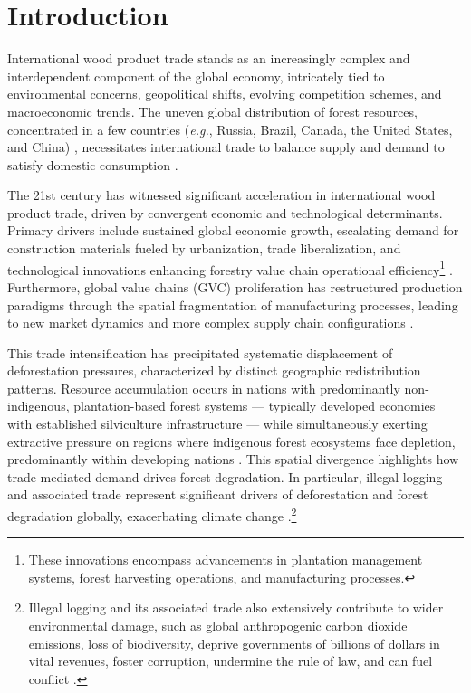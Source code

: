 \documentclass[
  authoryear,
  review,
  3p]{elsarticle}
\begin{document}
\section{Introduction}\label{introduction}

International wood product trade stands as an increasingly complex and
interdependent component of the global economy, intricately tied to
environmental concerns, geopolitical shifts, evolving competition
schemes, and macroeconomic trends. The uneven global distribution of
forest resources, concentrated in a few countries (\emph{e.g.}, Russia,
Brazil, Canada, the United States, and China) \citep{fao_state_2024},
necessitates international trade to balance supply and demand to satisfy
domestic consumption \citep{long_exploring_2019, huang_static_2024}.

The 21st century has witnessed significant acceleration in international
wood product trade, driven by convergent economic and technological
determinants. Primary drivers include sustained global economic growth,
escalating demand for construction materials fueled by urbanization,
trade liberalization, and technological innovations enhancing forestry
value chain operational efficiency\footnote{These innovations encompass
  advancements in plantation management systems, forest harvesting
  operations, and manufacturing processes.}
\citep{prestemon_international_2003, unecefao_forest_2022-1}.
Furthermore, global value chains (GVC) proliferation has restructured
production paradigms through the spatial fragmentation of manufacturing
processes, leading to new market dynamics and more complex supply chain
configurations \citep{amador_networks_2017}.

This trade intensification has precipitated systematic displacement of
deforestation pressures, characterized by distinct geographic
redistribution patterns. Resource accumulation occurs in nations with
predominantly non-indigenous, plantation-based forest systems ---
typically developed economies with established silviculture
infrastructure --- while simultaneously exerting extractive pressure on
regions where indigenous forest ecosystems face depletion, predominantly
within developing nations
\citep{prestemon_international_2003, leblois_what_2017, pendrill_deforestation_2019, abman_does_2020}.
This spatial divergence highlights how trade-mediated demand drives
forest degradation. In particular, illegal logging and associated trade
represent significant drivers of deforestation and forest degradation
globally, exacerbating climate change
\citep{lawson_illegal_2010}.\footnote{Illegal logging and its associated
  trade also extensively contribute to wider environmental damage, such
  as global anthropogenic carbon dioxide emissions, loss of
  biodiversity, deprive governments of billions of dollars in vital
  revenues, foster corruption, undermine the rule of law, and can fuel
  conflict \citep{lawson_illegal_2010}.}
\end{document}
